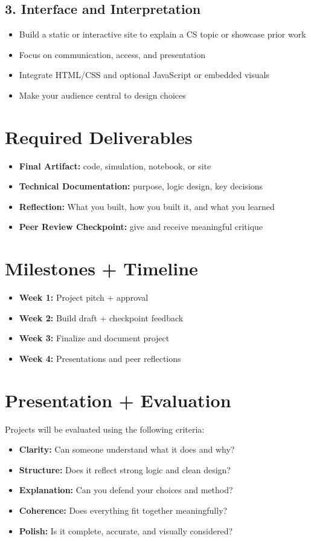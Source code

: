 \documentclass[11pt]{article}
\begin{document}
\subsection*{3. Interface and Interpretation}
\begin{itemize}[leftmargin=*]
  \item Build a static or interactive site to explain a CS topic or showcase prior work
  \item Focus on communication, access, and presentation
  \item Integrate HTML/CSS and optional JavaScript or embedded visuals
  \item Make your audience central to design choices
\end{itemize}

\section*{Required Deliverables}
\begin{itemize}[leftmargin=*]
  \item \textbf{Final Artifact:} code, simulation, notebook, or site
  \item \textbf{Technical Documentation:} purpose, logic design, key decisions
  \item \textbf{Reflection:} What you built, how you built it, and what you learned
  \item \textbf{Peer Review Checkpoint:} give and receive meaningful critique
\end{itemize}

\section*{Milestones + Timeline}
\begin{itemize}[leftmargin=*]
  \item \textbf{Week 1:} Project pitch + approval
  \item \textbf{Week 2:} Build draft + checkpoint feedback
  \item \textbf{Week 3:} Finalize and document project
  \item \textbf{Week 4:} Presentations and peer reflections
\end{itemize}

\section*{Presentation + Evaluation}
Projects will be evaluated using the following criteria:
\begin{itemize}[leftmargin=*]
  \item \textbf{Clarity:} Can someone understand what it does and why?
  \item \textbf{Structure:} Does it reflect strong logic and clean design?
  \item \textbf{Explanation:} Can you defend your choices and method?
  \item \textbf{Coherence:} Does everything fit together meaningfully?
  \item \textbf{Polish:} Is it complete, accurate, and visually considered?
\end{itemize}
\end{document}
